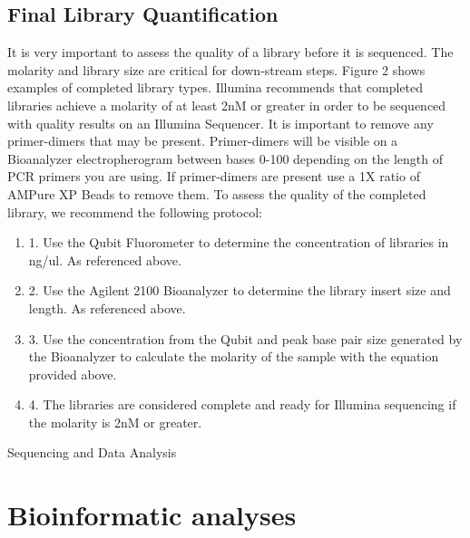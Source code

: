 \documentclass[graybox]{svmult}
\begin{document}
\subsection{Final Library Quantification}

It is very important to assess the quality of a library before it is sequenced. The molarity and library size are critical for down-stream steps. Figure 2 shows examples of completed library types. Illumina recommends that completed libraries achieve a molarity of at least 2nM or greater in order to be sequenced with quality results on an Illumina Sequencer. It is important to remove any primer-dimers that may be present. Primer-dimers will be visible on a Bioanalyzer electropherogram between bases 0-100 depending on the length of PCR primers you are using. If primer-dimers are present use a 1X ratio of AMPure XP Beads to remove them. To assess the quality of the completed library, we recommend the following protocol:
\begin{enumerate}
\item{1.      Use the Qubit Fluorometer to determine the concentration of libraries in ng/ul. As referenced above.}
\item{2.      Use the Agilent 2100 Bioanalyzer to determine the library insert size and length. As referenced above.}
\item{3.      Use the concentration from the Qubit and peak base pair size generated by the Bioanalyzer to calculate the molarity of the sample with the equation provided above.}
\item{4.      The libraries are considered complete and ready for Illumina sequencing if the molarity is 2nM or greater.}
\end{enumerate}

Sequencing and Data Analysis


\section{Bioinformatic analyses}
\label{sec:4}
\end{document}
